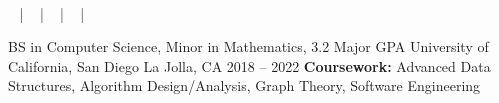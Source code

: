\documentclass[]{awesome-cv}
\begin{document}
\begin{center}
	\vspace{-5mm}
	  \\
	\vspace{2mm}
  \faEnvelope\  |
  \faMobile\  |
  \faLink\  |
  \faGithub\  |
  \faLinkedinSquare\ 
\end{center}
\vspace{-3mm}
\begin{cventries}
	\cventry
	{BS in Computer Science, Minor in Mathematics, 3.2 Major GPA}
	{University of California, San Diego}
	{La Jolla, CA}
	{2018 – 2022}
  {\textbf{Coursework:} Advanced Data Structures, Algorithm Design/Analysis,
    Graph Theory, Software Engineering}
\end{cventries}
\end{document}
